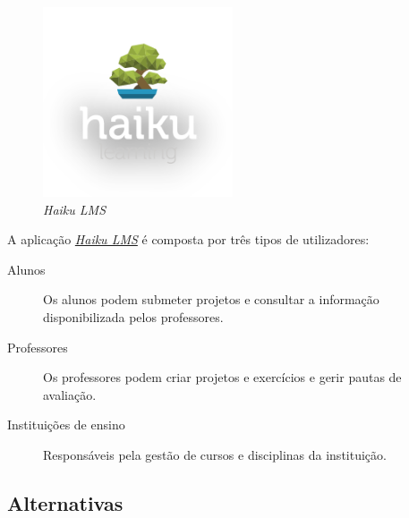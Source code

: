 \begin{figure}[H]
        \centering
        \includegraphics[width=0.5\textwidth]{images/concorrencia/haiku.png}
         \caption{\emph{Haiku LMS}}
         \label{fig: studifi}
\end{figure}

A aplicação \href{http://www.haikulearning.com/}{\emph{Haiku LMS}} é composta por três tipos de utilizadores:

\begin{description}
	\item[Alunos] Os alunos podem submeter projetos e consultar a informação disponibilizada pelos professores.
	\item[Professores] Os professores podem criar projetos e exercícios e gerir pautas de avaliação.
	\item[Instituições de ensino] Responsáveis pela gestão de cursos e disciplinas da instituição.
\end{description}

\subsection{Alternativas}
\label{sub:alternativas}

